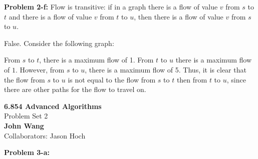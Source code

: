 \documentclass[psamsfonts]{amsart}
\newenvironment{sol}{\vspace{0.25cm}{\large \bfseries Solution:}}{\qedsymbol}
\newenvironment{prob}[1]{\begin{framed}{\large \bfseries Problem #1:}}{\end{framed}}
\newcommand{\makenewtitle}{
    \begin{center}
    {\huge \bfseries 6.854 Advanced Algorithms} \\
    Problem Set 2\\
    \vspace{0.25cm}
    {\bfseries John Wang} \\
    Collaborators: Jason Hoch
    \end{center}
    \vspace{0.5cm}
}
\begin{document}
\begin{prob}{2-f}
Flow is transitive: if in a graph there is a flow of value $v$ from $s$ to $t$ and there is a flow of value $v$ from $t$ to $u$, then there is a flow of value $v$ from $s$ to $u$.
\end{prob}
\begin{sol}
False. Consider the following graph:
\begin{figure}[h!]
\centering
{}
\end{figure}

From $s$ to $t$, there is a maximum flow of 1. From $t$ to $u$ there is a maximum flow of $1$. However, from $s$ to $u$, there is a maximum flow of 5. Thus, it is clear that the flow from $s$ to $u$ is not equal to the flow from $s$ to $t$ then from $t$ to $u$, since there are other paths for the flow to travel on. 
\end{sol}

\newpage
\makenewtitle
\begin{prob}{3-a}
\end{prob}
\begin{sol}
\end{sol}
\end{document}
